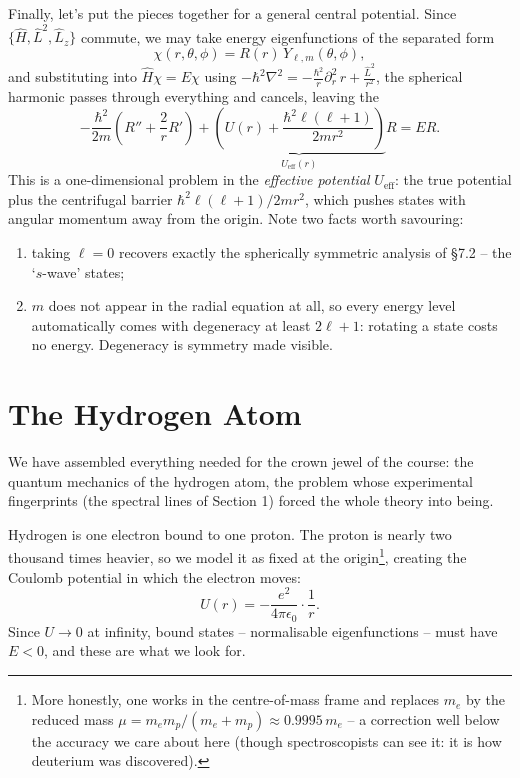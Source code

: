 Finally, let's put the pieces together for a general central potential. Since $\{\hat H, \hat L^2, \hat L_z\}$ commute, we may take energy eigenfunctions of the separated form
$$
\chi(r, \theta, \phi) = R(r) \, Y_{\ell, m}(\theta, \phi),
$$
and substituting into $\hat{H}\chi = E\chi$ using $-\hbar^2\nabla^2 = -\frac{\hbar^2}{r}\partial_r^2 \, r + \frac{\hat{L}^2}{r^2}$, the spherical harmonic passes through everything and cancels, leaving the 
$$
-\frac{\hbar^2}{2m}\left( R'' + \frac{2}{r}R' \right) + \underbrace{\left( U(r) + \frac{\hbar^2 \ell(\ell+1)}{2mr^2} \right)}_{U_{\text{eff}}(r)} R = E R.
$$
This is a one-dimensional problem in the \emph{effective potential} $U_{\text{eff}}$: the true potential plus the centrifugal barrier $\hbar^2\ell(\ell+1)/2mr^2$, which pushes states with angular momentum away from the origin. Note two facts worth savouring:
\begin{enumerate}[label=(\roman*)]
    \item taking $\ell = 0$ recovers exactly the spherically symmetric analysis of \S 7.2 -- the `$s$-wave' states;
    \item $m$ does not appear in the radial equation at all, so every energy level automatically comes with degeneracy at least $2\ell + 1$: rotating a state costs no energy. Degeneracy is symmetry made visible.
\end{enumerate}

\section{The Hydrogen Atom}

We have assembled everything needed for the crown jewel of the course: the quantum mechanics of the hydrogen atom, the problem whose experimental fingerprints (the spectral lines of Section 1) forced the whole theory into being.

Hydrogen is one electron bound to one proton. The proton is nearly two thousand times heavier, so we model it as fixed at the origin\footnote{More honestly, one works in the centre-of-mass frame and replaces $m_e$ by the reduced mass $\mu = m_e m_p/(m_e + m_p) \approx 0.9995 \, m_e$ -- a correction well below the accuracy we care about here (though spectroscopists can see it: it is how deuterium was discovered).}, creating the Coulomb potential in which the electron moves:
$$
U(r) = -\frac{e^2}{4 \pi \epsilon_0} \cdot \frac{1}{r}.
$$
Since $U \rightarrow 0$ at infinity, bound states -- normalisable eigenfunctions -- must have $E < 0$, and these are what we look for.

